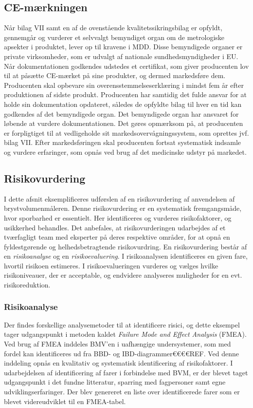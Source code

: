 \subsection{CE-mærkningen}
   
Når bilag VII samt en af de ovenstående kvalitetssikringsbilag er opfyldt, gennemgår og vurderer et selvvalgt bemyndiget organ om de metrologiske apsekter i produktet, lever op til kravene i MDD. Disse bemyndigede organer er private virksomheder, som er udvalgt af nationale sundhedsmyndigheder i EU. Når dokumentationen godkendes udstedes et certifikat, som giver producenten lov til at påsætte CE-mærket på sine produkter, og dermed markedsføre dem.    
 Producenten skal opbevare sin overensstemmelseserklæring i mindst fem år efter produktionen af sidste produkt. Producenten har samtidig det fulde ansvar for at holde sin dokumentation opdateret, således de opfyldte bilag til hver en tid kan godkendes af det bemyndigede organ. Det bemyndigede organ har ansvaret for løbende at vurdere dokumentationen.
Det gøres opmærksom på, at producenten er forpligtiget til at vedligeholde sit markedsovervågningssystem, som oprettes jvf. bilag VII. Efter markedsføringen skal producenten fortsat systematisk indsamle og vurdere erfaringer, som opnås ved brug af det medicinske udstyr på markedet. 

\subsection{Risikovurdering}
I dette afsnit eksemplificeres udførslen af en risikovurdering af anvendelsen af brystvolumenmåleren. Denne risikovurdering er en systematisk fremgangsmåde, hvor sporbarhed er essentielt. Her identificeres og vurderes risikofaktorer, og usikkerhed behandles. 
Det anbefales, at risikovurderingen udarbejdes af et tværfagligt team med eksperter på deres respektive områder, for at opnå en fyldestgørende og helhedsbetragtende risikovurdring.   
En risikovurdering består af en \textit{risikoanalyse} og en \textit{risikoevaluering}. I risikoanalysen identificeres en given fare, hvortil risikoen estimeres. I risikoevalueringen vurderes og vælges hvilke risikoniveauer, der er acceptable, og endvidere analyseres muligheder for en evt. risikoreduktion.

	\subsubsection{Risikoanalyse}
	Der findes forskellige analysemetoder til at identificere risici, og dette eksempel tager udgangspunkt i metoden kaldet \textit{Failure Mode and Effect Analysis}{} (FMEA). Ved brug af FMEA inddeles BMV'en i uafhængige undersystemer, som med fordel kan identificeres ud fra BBD- og IBD-diagrammer€€€€REF. Ved denne inddeling opnås en kvalitativ og systematisk identificering af risikofaktorer.
	I udarbejdelsen af identificering af farer i forbindelse med BVM, er der blevet taget udgangspunkt i det fundne litteratur, sparring med fagpersoner samt egne udviklingserfaringer. Der blev genereret en liste over identificerede farer som er blevet videreudviklet til en FMEA-tabel.  
	
